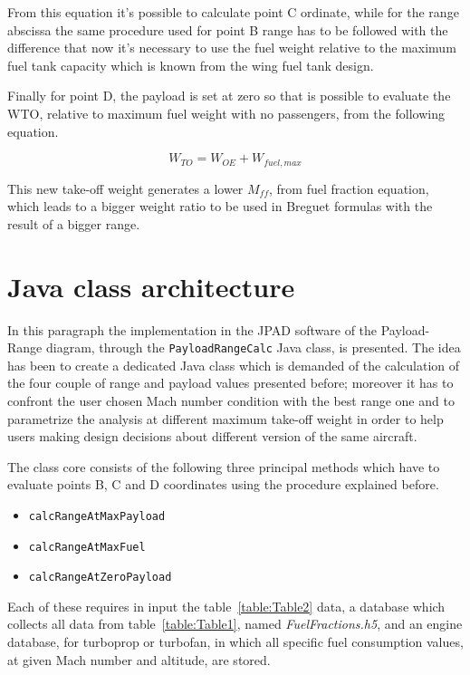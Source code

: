 \bigskip
\noindent
From this equation it’s possible to calculate point C ordinate, while for the range abscissa the same procedure used for point B range has to be followed with the difference that now it’s necessary to use the fuel weight relative to the maximum fuel tank capacity which is known from the wing fuel tank design.
  
Finally for point D, the payload is set at zero so that is possible to evaluate the WTO, relative to maximum fuel weight with no passengers, from the following equation.

\begin{equation}
W_{TO}=W_{OE}+W_{fuel,max}
\label{eqn:Equation1.7}
\end{equation}

\bigskip
\noindent
This new take-off weight generates a lower $M_{ff}$, from fuel fraction equation, which leads to a bigger weight ratio to be used in Breguet formulas with the result of a bigger range.

\bigskip
\section{Java class architecture}
In this paragraph the implementation in the JPAD software of the Payload-Range diagram, through the \lstinline[language=Java]!PayloadRangeCalc! Java class, is presented. The idea has been to create a dedicated Java class which is demanded of the calculation of the four couple of range and payload values presented before; moreover it has to confront the user chosen Mach number condition with the best range one and to parametrize the analysis at different maximum take-off weight in order to help users making design decisions about different version of the same aircraft.

The class core consists of the following three principal methods which have to evaluate points B, C and D coordinates using the procedure explained before.

\begin{itemize}
\item\lstinline[language=Java]!calcRangeAtMaxPayload!
\item\lstinline[language=Java]!calcRangeAtMaxFuel!
\item\lstinline[language=Java]!calcRangeAtZeroPayload!
\end{itemize}

\bigskip
\noindent
Each of these requires in input the table~\ref{table:Table2} data, a database which collects all data from table~\ref{table:Table1},  named \emph{FuelFractions.h5}, and an engine database, for turboprop or turbofan, in which all specific fuel consumption values, at given Mach number and altitude, are stored.


